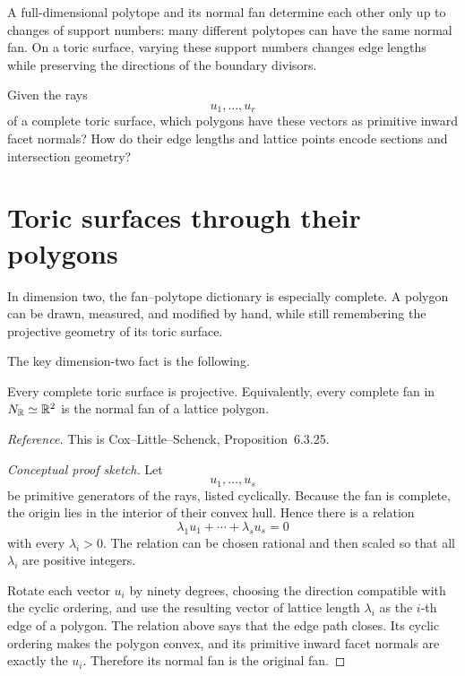 A full-dimensional polytope and its normal fan determine each other
only up to changes of support numbers: many different polytopes can
have the same normal fan. On a toric surface, varying these support
numbers changes edge lengths while preserving the directions of the
boundary divisors.

\begin{guidingquestion}
Given the rays
\[
u_1,\dots,u_r
\]
of a complete toric surface, which polygons have these vectors as
primitive inward facet normals? How do their edge lengths and lattice
points encode sections and intersection geometry?
\end{guidingquestion}

\section{Toric surfaces through their polygons}
\label{sec:toric-surfaces-polygons}

In dimension two, the fan--polytope dictionary is especially complete.
A polygon can be drawn, measured, and modified by hand, while still
remembering the projective geometry of its toric surface.

The key dimension-two fact is the following.

\begin{theorem}
\label{thm:complete-toric-surface-projective}
Every complete toric surface is projective. Equivalently, every
complete fan in \(N_{\mathbb{R}}\simeq\mathbb{R}^2\) is the normal fan of a lattice
polygon.
\end{theorem}

\noindent
\textit{Reference.}
This is Cox--Little--Schenck, Proposition~6.3.25.

\begin{proof}[Conceptual proof sketch]
Let
\[
u_1,\ldots,u_s
\]
be primitive generators of the rays, listed cyclically. Because the
fan is complete, the origin lies in the interior of their convex hull.
Hence there is a relation
\[
\lambda_1u_1+\cdots+\lambda_su_s=0
\]
with every \(\lambda_i>0\). The relation can be chosen rational and
then scaled so that all \(\lambda_i\) are positive integers.

Rotate each vector \(u_i\) by ninety degrees, choosing the direction
compatible with the cyclic ordering, and use the resulting vector of
lattice length \(\lambda_i\) as the \(i\)-th edge of a polygon. The
relation above says that the edge path closes. Its cyclic ordering
makes the polygon convex, and its primitive inward facet normals are
exactly the \(u_i\). Therefore its normal fan is the original fan.
\end{proof}

